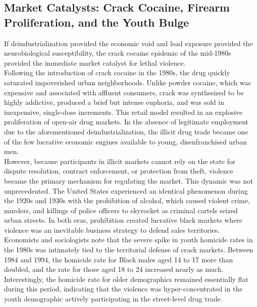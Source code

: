 \documentclass[
]{article}
\begin{document}
\subsection{\texorpdfstring{\textbf{Market Catalysts: Crack Cocaine,
Firearm Proliferation, and the Youth
Bulge}}{Market Catalysts: Crack Cocaine, Firearm Proliferation, and the Youth Bulge}}\label{market-catalysts-crack-cocaine-firearm-proliferation-and-the-youth-bulge}

If deindustrialization provided the economic void and lead exposure
provided the neurobiological susceptibility, the crack cocaine epidemic
of the mid-1980s provided the immediate market catalyst for lethal
violence.\\
Following the introduction of crack cocaine in the 1980s, the drug
quickly saturated impoverished urban neighborhoods. Unlike powder
cocaine, which was expensive and associated with affluent consumers,
crack was synthesized to be highly addictive, produced a brief but
intense euphoria, and was sold in inexpensive, single-dose increments.
This retail model resulted in an explosive proliferation of open-air
drug markets. In the absence of legitimate employment due to the
aforementioned deindustrialization, the illicit drug trade became one of
the few lucrative economic engines available to young, disenfranchised
urban men.\\
However, because participants in illicit markets cannot rely on the
state for dispute resolution, contract enforcement, or protection from
theft, violence became the primary mechanism for regulating the market.
This dynamic was not unprecedented. The United States experienced an
identical phenomenon during the 1920s and 1930s with the prohibition of
alcohol, which caused violent crime, murders, and killings of police
officers to skyrocket as criminal cartels seized urban streets. In both
eras, prohibition created lucrative black markets where violence was an
inevitable business strategy to defend sales territories. Economists and
sociologists note that the severe spike in youth homicide rates in the
1980s was intimately tied to the territorial defense of crack markets.
Between 1984 and 1994, the homicide rate for Black males aged 14 to 17
more than doubled, and the rate for those aged 18 to 24 increased nearly
as much. Interestingly, the homicide rate for older demographics
remained essentially flat during this period, indicating that the
violence was hyper-concentrated in the youth demographic actively
participating in the street-level drug trade.\\
\end{document}
